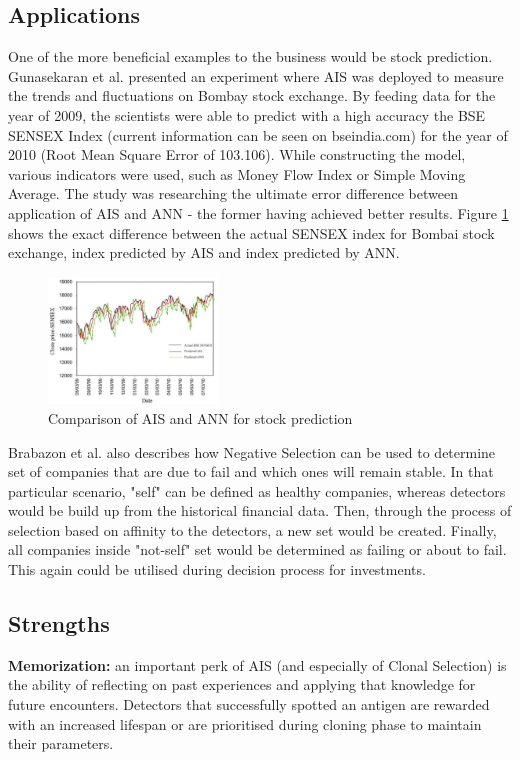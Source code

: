 \documentclass[letterpaper, 10 pt, conference]{ieeeconf}  %
\begin{document}
\subsection{Applications}
One of the more beneficial examples to the business would be stock prediction. Gunasekaran et al. \cite{gunasekaran2011evaluation} presented an experiment where AIS was deployed to measure the trends and fluctuations on Bombay stock exchange. By feeding data for the year of 2009, the scientists were able to predict with a high accuracy the BSE SENSEX Index (current information can be seen on bseindia.com) for the year of 2010 (Root Mean Square Error of 103.106). While constructing the model, various indicators were used, such as Money Flow Index or Simple Moving Average. The study was researching the ultimate error difference between application of AIS and ANN - the former having achieved better results. Figure \ref{fig:stock} shows the exact difference between the actual SENSEX index for Bombai stock exchange, index predicted by AIS and index predicted by ANN. \newline
\begin{figure}[h!]
  \centering
  \includegraphics[width=0.4\textwidth]{graph}
  \caption{Comparison of AIS and ANN for stock prediction \cite{gunasekaran2011evaluation}}
  \label{fig:stock}
\end{figure}
Brabazon et al. \cite{brabazon2006biologically} also describes how Negative Selection can be used to determine set of companies that are due to fail and which ones will remain stable. In that particular scenario, "self" can be defined as healthy companies, whereas detectors would be build up from the historical financial data. Then, through the process of selection based on affinity to the detectors, a new set would be created. Finally, all companies inside "not-self" set would be determined as failing or about to fail. This again could be utilised during decision process for investments. 


\subsection{Strengths} 
\textbf{Memorization:} an important perk of AIS (and especially of Clonal Selection) is the ability of reflecting on past experiences and applying that knowledge for future encounters. \cite{timmis2004overview} Detectors that successfully spotted an antigen are rewarded with an increased lifespan or are prioritised during cloning phase to maintain their parameters. 
\end{document}
